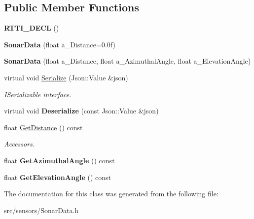 \subsection*{Public Member Functions}
\begin{DoxyCompactItemize}
\item 
\mbox{\label{class_sonar_data_a221b8ca0c950a341af00b771ef489dc7}} 
{\bfseries R\+T\+T\+I\+\_\+\+D\+E\+CL} ()
\item 
\mbox{\label{class_sonar_data_a765830eaf4c535938a4736f07d825c44}} 
{\bfseries Sonar\+Data} (float a\+\_\+\+Distance=0.\+0f)
\item 
\mbox{\label{class_sonar_data_a83c641607fa0025244fb1ff5add50ce6}} 
{\bfseries Sonar\+Data} (float a\+\_\+\+Distance, float a\+\_\+\+Azimuthal\+Angle, float a\+\_\+\+Elevation\+Angle)
\item 
\mbox{\label{class_sonar_data_a9ae1f15cd81c1bb11f1a3332b15fb048}} 
virtual void \hyperlink{class_sonar_data_a9ae1f15cd81c1bb11f1a3332b15fb048}{Serialize} (Json\+::\+Value \&json)
\begin{DoxyCompactList}\small\item\em I\+Serializable interface. \end{DoxyCompactList}\item 
\mbox{\label{class_sonar_data_a6e552f9ff77073efb81258b364073af3}} 
virtual void {\bfseries Deserialize} (const Json\+::\+Value \&json)
\item 
\mbox{\label{class_sonar_data_a757878d690c821a92ac26cc2125c7515}} 
float \hyperlink{class_sonar_data_a757878d690c821a92ac26cc2125c7515}{Get\+Distance} () const
\begin{DoxyCompactList}\small\item\em Accessors. \end{DoxyCompactList}\item 
\mbox{\label{class_sonar_data_a1e6bbf92a7c0d9025a2c442b7e053f26}} 
float {\bfseries Get\+Azimuthal\+Angle} () const
\item 
\mbox{\label{class_sonar_data_a713f750fde277ea4c33ee5d9f225423e}} 
float {\bfseries Get\+Elevation\+Angle} () const
\end{DoxyCompactItemize}


The documentation for this class was generated from the following file\+:\begin{DoxyCompactItemize}
\item 
src/sensors/Sonar\+Data.\+h\end{DoxyCompactItemize}
